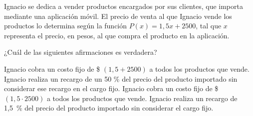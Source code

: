 \documentclass{sn-guia}
\begin{document}
\begin{problemas}
\begin{alternativasgraficas}[raster columns=3]
        \grafica 
        \grafica 
        \grafica 
    \end{alternativasgraficas}
    
    \problema Ignacio se dedica a vender productos encargados por sus clientes, 
    que importa mediante una aplicación móvil. El precio de venta al que Ignacio 
    vende los productos lo determina según la función $P(x)=1,5x+2500$, tal que $x$
    representa el precio, en pesos, al que compra el producto en la aplicación.

    ¿Cuál de las siguientes afirmaciones es verdadera?
    \begin{alternativas}
        \alternativa Ignacio cobra un costo fijo de \$ $(1,5 + 2500)$ a todos los
        productos que vende.
        \alternativa Ignacio realiza un recargo de un 50 \% del precio del 
        producto importado sin considerar ese recargo en el cargo fijo.
        \alternativa Ignacio cobra un costo fijo de \$ $(1,5\cdot 2500)$ a todos
        los productos que vende.
        \alternativa Ignacio realiza un recargo de 1,5 \% del precio del producto 
        importado sin considerar el cargo fijo.
    \end{alternativas}
    

\end{problemas}
\end{document}
